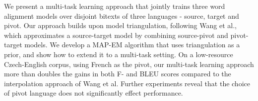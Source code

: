 We present a multi-task learning approach that jointly trains three word alignment models over disjoint bitexts of three languages - source, target and pivot. Our approach builds upon model triangulation, following Wang et al., which approximates a source-target model by combining source-pivot and pivot-target models. We develop a MAP-EM algorithm that uses triangulation as a prior, and show how to extend it to a multi-task setting. On a low-resource Czech-English corpus, using French as the pivot, our multi-task learning approach more than doubles the gains in both F- and BLEU scores compared to the interpolation approach of Wang et al. Further experiments reveal that the choice of pivot language does not significantly effect performance.
